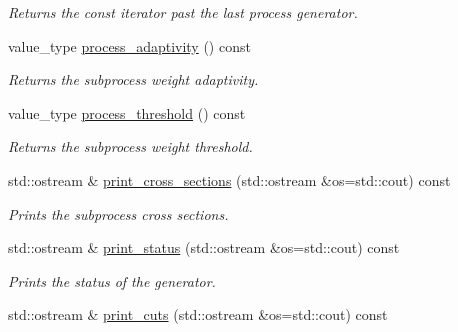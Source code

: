 \begin{DoxyCompactItemize}
\begin{DoxyCompactList}\small\item\em Returns the const iterator past the last process generator. \end{DoxyCompactList}\item 
\hypertarget{a00210_a02284885861a310068368c3a67bc8453}{value\-\_\-type \hyperlink{a00210_a02284885861a310068368c3a67bc8453}{process\-\_\-adaptivity} () const }\label{a00210_a02284885861a310068368c3a67bc8453}

\begin{DoxyCompactList}\small\item\em Returns the subprocess weight adaptivity. \end{DoxyCompactList}\item 
\hypertarget{a00210_ab416c9758e0eb56d9f44c577807fca54}{value\-\_\-type \hyperlink{a00210_ab416c9758e0eb56d9f44c577807fca54}{process\-\_\-threshold} () const }\label{a00210_ab416c9758e0eb56d9f44c577807fca54}

\begin{DoxyCompactList}\small\item\em Returns the subprocess weight threshold. \end{DoxyCompactList}\item 
\hypertarget{a00210_a600c6463d26cb42cfb01ad2a5fa81e8a}{std\-::ostream \& \hyperlink{a00210_a600c6463d26cb42cfb01ad2a5fa81e8a}{print\-\_\-cross\-\_\-sections} (std\-::ostream \&os=std\-::cout) const }\label{a00210_a600c6463d26cb42cfb01ad2a5fa81e8a}

\begin{DoxyCompactList}\small\item\em Prints the subprocess cross sections. \end{DoxyCompactList}\item 
\hypertarget{a00210_a7138ff23c58327dd958c5d261ab18421}{std\-::ostream \& \hyperlink{a00210_a7138ff23c58327dd958c5d261ab18421}{print\-\_\-status} (std\-::ostream \&os=std\-::cout) const }\label{a00210_a7138ff23c58327dd958c5d261ab18421}

\begin{DoxyCompactList}\small\item\em Prints the status of the generator. \end{DoxyCompactList}\item 
\hypertarget{a00210_abe047fb221ea9c4d0d4abaddd270b585}{std\-::ostream \& \hyperlink{a00210_abe047fb221ea9c4d0d4abaddd270b585}{print\-\_\-cuts} (std\-::ostream \&os=std\-::cout) const }\label{a00210_abe047fb221ea9c4d0d4abaddd270b585}


\end{DoxyCompactItemize}

